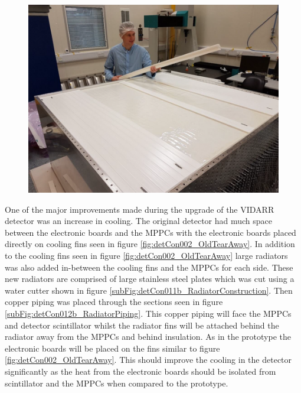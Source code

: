 \begin{figure}[htbp]
\centering
\includegraphics[width=0.8\linewidth]{Chapter3/Figs/Raster/detCon006_RonInCleanRoom.png}
\label{fig:detCon006_RonInCleanRoom}
\end{figure}

One of the major improvements made during the upgrade of the VIDARR detector was an increase in cooling. The original detector had much space between the electronic boards and the MPPCs with the electronic boards placed directly on cooling fins seen in figure \ref{fig:detCon002_OldTearAway}. In addition to the cooling fins seen in figure \ref{fig:detCon002_OldTearAway} large radiators was also added in-between the cooling fins and the MPPCs for each side. These new radiators are comprised of large stainless steel plates which was cut using a water cutter shown in figure \ref{subFig:detCon011b_RadiatorConstruction}. Then copper piping was placed through the sections seen in figure \ref{subFig:detCon012b_RadiatorPiping}. This copper piping will face the MPPCs and detector scintillator whilst the radiator fins will be attached behind the radiator away from the MPPCs and behind insulation. As in the prototype the electronic boards will be placed on the fins similar to figure \ref{fig:detCon002_OldTearAway}. This should improve the cooling in the detector significantly as the heat from the electronic boards should be isolated from scintillator and the MPPCs when compared to the prototype. 

